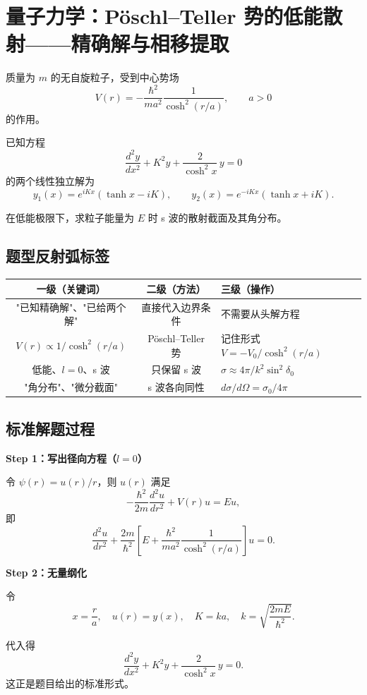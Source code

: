 
\section{量子力学：Pöschl--Teller 势的低能散射——精确解与相移提取}
\label{sec:poschl-teller}

\begin{modelbox}
质量为 $m$ 的无自旋粒子，受到中心势场
\[
V(r) = -\frac{\hbar^2}{ma^2}\frac{1}{\cosh^2(r/a)},\qquad a>0
\]
的作用。

已知方程
\[
\frac{d^2y}{dx^2} + K^2 y + \frac{2}{\cosh^2 x}\,y = 0
\]
的两个线性独立解为
\[
y_1(x) = e^{iKx}(\tanh x - iK),\qquad
y_2(x) = e^{-iKx}(\tanh x + iK).
\]

在低能极限下，求粒子能量为 $E$ 时 s 波的散射截面及其角分布。
\end{modelbox}

\subsection{题型反射弧标签}

\begin{tipbox}
\begin{center}
\renewcommand{\arraystretch}{1.5}
\begin{tabular}{|c|c|l|}
\hline
\textbf{一级（关键词）} & \textbf{二级（方法）} & \textbf{三级（操作）} \\
\hline
"已知精确解"、"已给两个解" & 直接代入边界条件 & 不需要从头解方程 \\
\hline
$V(r) \propto 1/\cosh^2(r/a)$ & Pöschl--Teller 势 & 记住形式 $V = -V_0/\cosh^2(r/a)$ \\
\hline
低能、$l=0$、s 波 & 只保留 s 波 & $\sigma \approx 4\pi/k^2 \sin^2\delta_0$ \\
\hline
"角分布"、"微分截面" & s 波各向同性 & $d\sigma/d\Omega = \sigma_0/4\pi$ \\
\hline
\end{tabular}
\end{center}
\end{tipbox}

\subsection{标准解题过程}

\begin{derivationbox}[径向方程与无量纲化]
\textbf{Step 1：写出径向方程（$l=0$）}

令 $\psi(r) = u(r)/r$，则 $u(r)$ 满足
\[
-\frac{\hbar^2}{2m}\frac{d^2u}{dr^2} + V(r)u = Eu,
\]
即
\[
\frac{d^2u}{dr^2} + \frac{2m}{\hbar^2}\left[E + \frac{\hbar^2}{ma^2}\frac{1}{\cosh^2(r/a)}\right]u = 0.
\]

\textbf{Step 2：无量纲化}

令
\[
x = \frac{r}{a},\quad u(r) = y(x),\quad K = ka,\quad k = \sqrt{\frac{2mE}{\hbar^2}}.
\]

代入得
\[
\frac{d^2y}{dx^2} + K^2 y + \frac{2}{\cosh^2 x}\,y = 0.
\]
这正是题目给出的标准形式。
\end{derivationbox}

